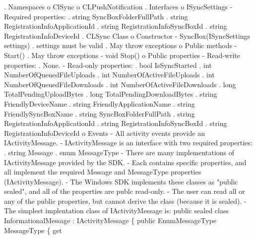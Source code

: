 
\begin{DoxyCode}
. Namespaces
  o ClSync
  o CLPushNotification
. Interfaces
  o ISyncSettings
    - Required properties:
      . \textcolor{keywordtype}{string} SyncBoxFolderFullPath
      . \textcolor{keywordtype}{string} RegistrationInfoApplicationId
      . \textcolor{keywordtype}{string} RegistrationInfoSyncBoxId
      . \textcolor{keywordtype}{string} RegistrationInfoDeviceId
. CLSync Class
  o Constructor
    - SyncBox(ISyncSettings settings)
      . settings must be valid
      . May \textcolor{keywordflow}{throw} exceptions
  o Public methods
    - Start()
      . May \textcolor{keywordflow}{throw} exceptions
    - \textcolor{keywordtype}{void} Stop()
  o Public properties
    - Read-write properties:
      . None.
    - Read-only properties:
      . \textcolor{keywordtype}{bool} IsSyncStarted
      . \textcolor{keywordtype}{int} NumberOfQueuedFileUploads
      . \textcolor{keywordtype}{int} NumberOfActiveFileUploads
      . \textcolor{keywordtype}{int} NumberOfQueuedFileDownloads
      . \textcolor{keywordtype}{int} NumberOfActiveFileDownloads
      . \textcolor{keywordtype}{long} TotalPendingUploadBytes
      . \textcolor{keywordtype}{long} TotalPendingDownloadBytes
      . \textcolor{keywordtype}{string} FriendlyDeviceName
      . \textcolor{keywordtype}{string} FriendlyApplicationName
      . \textcolor{keywordtype}{string} FriendlySyncBoxName
      . \textcolor{keywordtype}{string} SyncBoxFolderFullPath
      . \textcolor{keywordtype}{string} RegistrationInfoApplicationId
      . \textcolor{keywordtype}{string} RegistrationInfoSyncBoxId
      . \textcolor{keywordtype}{string} RegistrationInfoDeviceId
  o Events
    - All activity events provide an IActivityMessage.
    - IActivityMessage is an interface with two required properties: 
      . \textcolor{keywordtype}{string} Message
      . enum MessageType
    - There are many implementations of IActivityMessage provided by the SDK.
    - Each contains specific properties, and all implement the required Message
       and MessageType properties (IActivityMessage).
    - The Windows SDK implements these classes as "public sealed", and all of 
      the properties are publc read-only.
    - The user can read all or any of the public properties, but cannot derive 
      the class (because it is sealed).
    - The simplest implentation class of IActivityMessage is:
          public sealed class InformationalMessage : IActivityMessage
          \{
              \textcolor{keyword}{public} EnumMessageType MessageType 
              \{
                  \textcolor{keyword}{get}

\end{DoxyCode}
